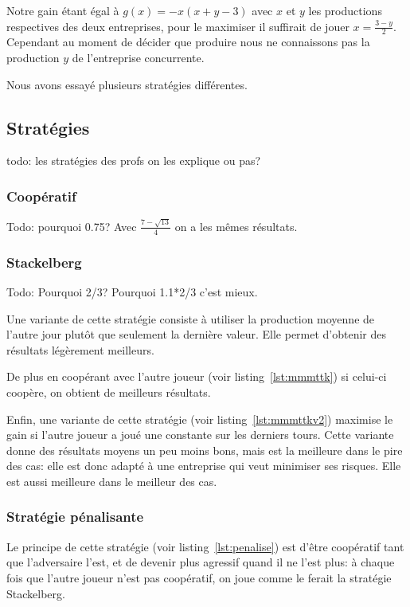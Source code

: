 \documentclass{scrartcl}
\begin{document}
  Notre gain étant égal à $g(x) = -x(x+y-3)$ avec $x$ et $y$ les productions
  respectives des deux entreprises, pour le maximiser il suffirait de jouer
  $x=\frac{3-y}{2}$. Cependant au moment de décider que produire nous ne
  connaissons pas la production $y$ de l'entreprise concurrente.

  Nous avons essayé plusieurs stratégies différentes.

  \subsection{Stratégies}
    todo: les stratégies des profs on les explique ou pas?
    \subsubsection{Coopératif}
    Todo: pourquoi 0.75? Avec $\frac{7-\sqrt{13}}{4}$ on a les mêmes résultats.

    \subsubsection{Stackelberg}
      Todo: Pourquoi 2/3? Pourquoi 1.1*2/3 c'est mieux.

      Une variante de cette stratégie consiste à utiliser la production moyenne
      de l'autre jour plutôt que seulement la dernière valeur. Elle permet
      d'obtenir des résultats légèrement meilleurs.

      De plus en coopérant avec l'autre joueur (voir listing~\ref{lst:mmmttk})
      si celui-ci coopère, on obtient de meilleurs résultats.

      Enfin, une variante de cette stratégie (voir listing~\ref{lst:mmmttkv2})
      maximise le gain si l'autre joueur a joué une constante sur les derniers
      tours. Cette variante donne des résultats moyens un peu moins bons, mais
      est la meilleure dans le pire des cas: elle est donc adapté à une
      entreprise qui veut minimiser ses risques. Elle est aussi meilleure dans
      le meilleur des cas.

    \subsubsection{Stratégie pénalisante}
      Le principe de cette stratégie (voir listing~\ref{lst:penalise}) est
      d'être coopératif tant que l'adversaire l'est, et de devenir plus
      agressif quand il ne l'est plus: à chaque fois que l'autre joueur n'est
      pas coopératif, on joue comme le ferait la stratégie Stackelberg.
\end{document}
